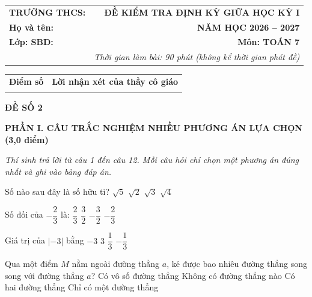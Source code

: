 \documentclass[12pt,a4paper]{article}
\begin{document}
\noindent
\begin{tabularx}{\linewidth}{X r}
\textbf{TRƯỜNG THCS: \dotfill} & \textbf{ĐỀ KIỂM TRA ĐỊNH KỲ GIỮA HỌC KỲ I} \\
\textbf{Họ và tên: \dotfill} & \textbf{NĂM HỌC 2026 -- 2027} \\
\textbf{Lớp: \dotfill \quad SBD: \dotfill} & \textbf{Môn: TOÁN 7} \\
& \textit{Thời gian làm bài: 90 phút (không kể thời gian phát đề)}
\end{tabularx}

\vspace{1.5mm}
\noindent
\begin{tabularx}{\linewidth}{|p{3.5cm}|X|}
\hline
\centering\textbf{Điểm số} & \centering\textbf{Lời nhận xét của thầy cô giáo} \tabularnewline
\rule{0pt}{1.6cm} & \\
\hline
\end{tabularx}

\vspace{2.5mm}
\begin{center}
\textbf{\large ĐỀ SỐ 2}
\end{center}

\noindent\textbf{\large PHẦN I. CÂU TRẮC NGHIỆM NHIỀU PHƯƠNG ÁN LỰA CHỌN (3,0 điểm)}

\textit{Thí sinh trả lời từ câu 1 đến câu 12. Mỗi câu hỏi chỉ chọn một phương án đúng nhất và ghi vào bảng đáp án.}

\vspace{1mm}
\begin{ex}
Số nào sau đây là số hữu tỉ?
\choice
{$\sqrt{5}$}
{$\sqrt{2}$}
{$\sqrt{3}$}
{\True $\sqrt{4}$}
\end{ex}

\begin{ex}
Số đối của $-\dfrac{2}{3}$ là:
\choice
{\True $\dfrac{2}{3}$}
{$\dfrac{3}{2}$}
{$-\dfrac{3}{2}$}
{$-\dfrac{2}{3}$}
\end{ex}

\begin{ex}
Giá trị của $|-3|$ bằng
\choice
{$-3$}
{\True $3$}
{$\dfrac{1}{3}$}
{$-\dfrac{1}{3}$}
\end{ex}

\begin{ex}
Qua một điểm $M$ nằm ngoài đường thẳng $a$, kẻ được bao nhiêu đường thẳng song song với đường thẳng $a$?
\choice
{Có vô số đường thẳng}
{Không có đường thẳng nào}
{Có hai đường thẳng}
{\True Chỉ có một đường thẳng}
\end{ex}
\end{document}
